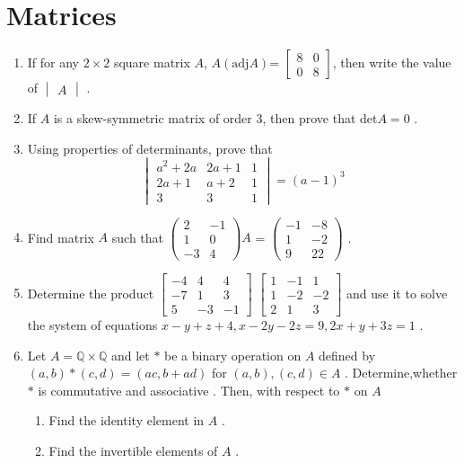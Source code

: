 \documentclass{article}
\newcommand{\mydet}[1]{\ensuremath{\begin{vmatrix}#1\end{vmatrix}}}
\providecommand{\brak}[1]{\ensuremath{\left(#1\right)}}
\begin{document}
\section{Matrices}
\begin{enumerate}
	\item If for any $2 \times 2$ square matrix $A$, $A\brak{\text{adj}A}$=
	$\begin{bmatrix}
		8 & 0\\
	        0 & 8
	\end{bmatrix}$, then write the value of 
	$\mydet{A}$ .

\item If $A$ is a skew-symmetric matrix of order $3$, then prove that det$ A=0$ .
\item Using properties of determinants, prove that
	\[\begin{vmatrix}
		a^2+2a & 2a+1 & 1\\
		2a+1   & a+2  & 1 \\
		  3    &  3   & 1
	\end{vmatrix} =\brak{a-1}^3\]	
\item Find matrix $A$ such that 
	$\begin{pmatrix}
		2 & -1\\
		1 & 0\\
		-3 & 4
	 \end{pmatrix}$$A$ =
	 $\begin{pmatrix}
		 -1 & -8\\
		 1 & -2\\
		 9 & 22
          \end{pmatrix}$ .		 
\item Determine the product
	$\begin{bmatrix}
		 -4 & 4 & 4\\
		 -7 & 1 & 3\\
		  5 & -3 & -1
        \end{bmatrix}$
       $\begin{bmatrix}
	       1 & -1 &  1\\
	       1 & -2 & -2\\
	       2 &  1 &  3
	\end{bmatrix}$ and use it to solve the system of equations $x-y+z+4, x-2y-2z=9, 2x+y+3z=1$ .
  \item Let $A=\mathbb{Q}\times\mathbb{Q}$ and let $*$ be a binary operation  on $A$ defined by $\brak{a, b} *\brak{c, d} = \brak{ac, b+ad}$ for $\brak{a, b}, \brak{c, d} \in A$ . Determine,whether $*$ is commutative and associative . Then, with respect to $*$ on $A$ 
	\begin{enumerate}[label =\roman*]
	 \item Find the identity element in $A$ .
         \item Find the invertible elements of $A$ .
	\end{enumerate}
\end{enumerate}
\end{document}
